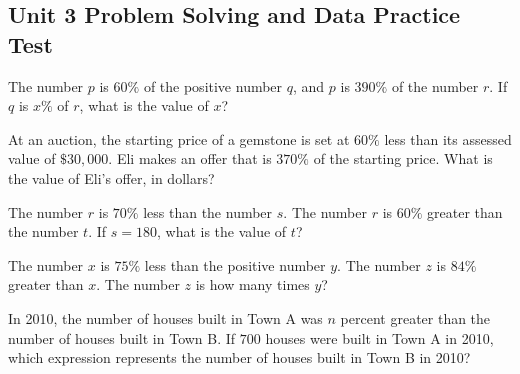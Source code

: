 \subsection*{Unit 3 Problem Solving and Data Practice Test}

\setcounter{questionnum}{0}

\noindent\markforreview
\vspace{1em}

The number \(p\) is \(60\%\) of the positive number \(q\), and \(p\) is \(390\%\) of the number \(r\).  
If \(q\) is \(x\%\) of \(r\), what is the value of \(x\)?

\vspace{2em}

\noindent\markforreview
\vspace{1em}

At an auction, the starting price of a gemstone is set at \(60\%\) less than its assessed value of \(\$30{,}000\).  
Eli makes an offer that is \(370\%\) of the starting price.  
What is the value of Eli's offer, in dollars?

\vspace{2em}

\noindent\markforreview
\vspace{1em}

The number \(r\) is \(70\%\) less than the number \(s\).  
The number \(r\) is \(60\%\) greater than the number \(t\).  
If \(s = 180\), what is the value of \(t\)?

\vspace{2em}

\noindent\markforreview
\vspace{1em}

The number \(x\) is \(75\%\) less than the positive number \(y\).  
The number \(z\) is \(84\%\) greater than \(x\).  
The number \(z\) is how many times \(y\)?

\vspace{2em}

\noindent\markforreview
\vspace{1em}

In 2010, the number of houses built in Town A was \(n\) percent greater than the number of houses built in Town B.  
If \(700\) houses were built in Town A in 2010, which expression represents the number of houses built in Town B in 2010?



